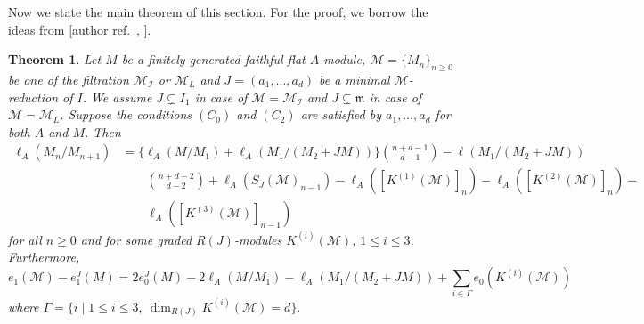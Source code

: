 \documentclass[10pt,a4paper]{amsart}
\def\I{{\mathcal I}}
\def\M{{\mathcal M}}
\newcommand{\m}{\mathfrak m}
\newtheorem{theorem}{Theorem}
\renewcommand{\cite}[2][]{\textup{[author ref.\ \texttt{\detokenize{#2}}\if\relax\detokenize{#1}\relax\else, #1\fi]}}
\begin{document}
Now we state the main theorem of this section. For the proof, we borrow the ideas from \cite{ozeki13}.  
 \begin{theorem}\label{lemma-3.3} 
	 Let $M$ be a finitely generated faithful flat $A$-module, $\M=\{M_n\}_{n\geq 0}$ be one of  the filtration $\M_\I$ or $\M_L$  and $J=(a_1,\ldots,a_d)$ be a minimal $\M$-reduction of $I$. We assume $J\subsetneq I_1$ in case of $\M=\M_\I$ and $J\subsetneq \m$  in case of $\M=\M_L$. Suppose the conditions $(C_0)$ and $(C_2)$ are satisfied by $a_1,\ldots,a_d$ for both $A$ and $M$. Then 
    \begin{align*}		\ell_A(M_n/M_{n+1})&=\Big \{\ell_A(M/M_1)+\ell_A(M_1/(M_2+JM))\Big\}\binom{n+d-1}{d-1}
		-\ell(M_1/({M_2}+JM))\\&\qquad \binom{n+d-2}{d-2}
		 +\ell_A(S_J(\M)_{n-1})-\ell_A([K^{(1)}(\M)]_{n})-\ell_A([K^{(2)}(\M)]_{n})-\\&\qquad\ell_A([K^{(3)}(\M)]_{n-1})
	\end{align*}
	for all $n\geq 0$ and for some   graded $R(J)$-modules $K^{(i)}(\M)$, $1\leq i\leq 3$. Furthermore, 
	$$
		e_1(\M)-e_1^J(M)= 2 e_0^J(M)-  2\ell_A(M/M_1)-\ell_A(M_1/(M_2+JM))+\mathop\sum\limits_{i\in\Gamma}e_0(K^{(i)}(\M))
	$$
    where $\Gamma=\{i\mid 1\leq i\leq 3, ~\dim_{R(J)} K^{(i)}(\M)=d\}.$
\end{theorem}
\end{document}
